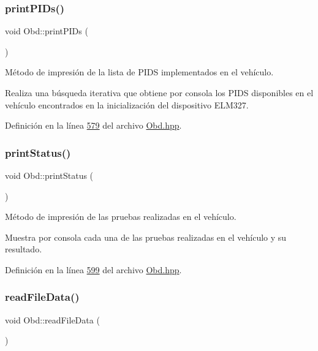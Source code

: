 \subsubsection{\texorpdfstring{print\+P\+I\+Ds()}{printPIDs()}}
{\footnotesize\ttfamily void Obd\+::print\+P\+I\+Ds (\begin{DoxyParamCaption}{ }\end{DoxyParamCaption})\hspace{0.3cm}{\ttfamily [inline]}}



Método de impresión de la lista de P\+I\+DS implementados en el vehículo. 

Realiza una búsqueda iterativa que obtiene por consola los P\+I\+DS disponibles en el vehículo encontrados en la inicialización del dispositivo E\+L\+M327. 

Definición en la línea \hyperlink{Obd_8hpp_source_l00579}{579} del archivo \hyperlink{Obd_8hpp_source}{Obd.\+hpp}.

\mbox{\label{classObd_a0938bfdd6d05795e826a239cc0f29f32}} 
\subsubsection{\texorpdfstring{print\+Status()}{printStatus()}}
{\footnotesize\ttfamily void Obd\+::print\+Status (\begin{DoxyParamCaption}{ }\end{DoxyParamCaption})\hspace{0.3cm}{\ttfamily [inline]}}



Método de impresión de las pruebas realizadas en el vehículo. 

Muestra por consola cada una de las pruebas realizadas en el vehículo y su resultado. 

Definición en la línea \hyperlink{Obd_8hpp_source_l00599}{599} del archivo \hyperlink{Obd_8hpp_source}{Obd.\+hpp}.

\mbox{\label{classObd_a2b8bd75834351a2205d53aec8b3747be}} 
\subsubsection{\texorpdfstring{read\+File\+Data()}{readFileData()}}
{\footnotesize\ttfamily void Obd\+::read\+File\+Data (\begin{DoxyParamCaption}{ }\end{DoxyParamCaption})\hspace{0.3cm}{\ttfamily [inline]}}




